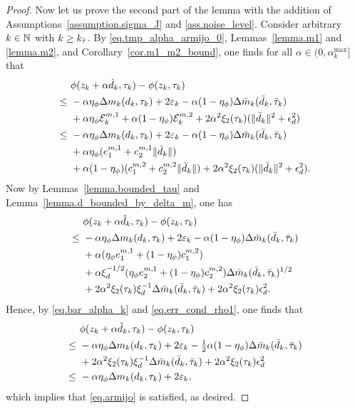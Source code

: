 \begin{proof}
  Now let us prove the second part of the lemma with the addition of Assumptions~\ref{assumption.sigma_J} and \ref{ass.noise_level}.  Consider arbitrary $k \in \mathbb{N}$ with $k \geq k_{{\bar \tau}}$.  By \eqref{eq.tmp_alpha_armijo_0}, Lemmas~\ref{lemma.m1} and \ref{lemma.m2}, and Corollary~\ref{cor.m1_m2_bound}, one finds for all $\alpha \in (0, \alpha_k^{\max}]$ that
  \begin{align*}
    &\ \phi(z_k+\alpha {\hat d}_k, \tau_k)  - \phi(z_k, \tau_k) \\
    \leq&\ -\alpha \eta_\phi \Delta m_k( d_k, \tau_k) + 2 \varepsilon_k - \alpha (1-\eta_\phi) \Delta {\bar m}_k({\bar d}_k, {\bar \tau}_k) \\
    &\ + \alpha \eta_\phi \mathcal{E}_k^{m, 1} + \alpha(1 - \eta_\phi) \mathcal{E}_k^{m, 2} + 2\alpha^2 \xi_2(\tau_k) (\|{\bar d}_k \|^2+ \epsilon_d^2) \\
    \leq&\ -\alpha \eta_\phi \Delta m_k( d_k, \tau_k) + 2 \varepsilon_k - \alpha (1-\eta_\phi) \Delta {\bar m}_k({\bar d}_k, {\bar \tau}_k) \\
    &\ + \alpha \eta_\phi (e_1^{m, 1} + e_2^{m, 1} \|{\bar d}_k\|) \\
    &\ + \alpha(1 - \eta_\phi) (c_1^{m, 2} + c_2^{m, 2} \|{\bar d}_k\|) + 2\alpha^2 \xi_2(\tau_k) (\|{\bar d}_k \|^2+ \epsilon_d^2).
  \end{align*}
  Now by Lemmas~\ref{lemma.bounded_tau} and Lemma~\ref{lemma.d_bounded_by_delta_m}, one has 
  \begin{align*}
    &\ \phi(z_k+\alpha {\hat d}_k, \tau_k)  - \phi(z_k, \tau_k) \\
    \leq&\ -\alpha \eta_\phi \Delta m_k( d_k, \tau_k) + 2 \varepsilon_k  -\alpha (1-\eta_\phi) \Delta {\bar m}_k({\bar d}_k, {\bar \tau}_k)  \\ 
    &\ + \alpha (\eta_{\phi} e_1^{m, 1} + (1 - \eta_{\phi}) c_1^{m, 2} ) \\
    &\ + \alpha \xi_d^{-1/2} (\eta_{\phi} e_2^{m, 1} + (1 - \eta_{\phi}) c_2^{m, 2} ) \Delta {\bar m}_k({\bar d}_k, {\bar \tau}_k)^{1/2} \\
    &\ + 2 \alpha^2 \xi_2(\tau_k) \xi_d^{-1} \Delta {\bar m}_k({\bar d}_k, {\bar \tau}_k) +  2 \alpha^2 \xi_2(\tau_k) \epsilon_d^2. 
  \end{align*}
  Hence, by \eqref{eq.bar_alpha_k} and \eqref{eq.err_cond_rho1}, one finds that
  \begin{align*}
    &\ \phi(z_k + \alpha {\hat d}_k, \tau_k) - \phi(z_k, \tau_k) \\
    \leq&\ - \alpha \eta_\phi \Delta m_k( d_k, \tau_k) + 2 \varepsilon_k - \tfrac{1}{2} \alpha  (1 - \eta_\phi) \Delta {\bar m}_k({\bar d}_k, {\bar \tau}_k) \\
    &\ + 2 \alpha^2 \xi_2(\tau_k) \xi_d^{-1} \Delta {\bar m}_k({\bar d}_k, {\bar \tau}_k) +  2 \alpha^2 \xi_2(\tau_k) \epsilon_d^2 \\
    \leq&\ - \alpha \eta_\phi \Delta m_k( d_k, \tau_k) + 2 \varepsilon_k,
  \end{align*}
  which implies that \eqref{eq.armijo} is satisfied, as desired.
\end{proof}

